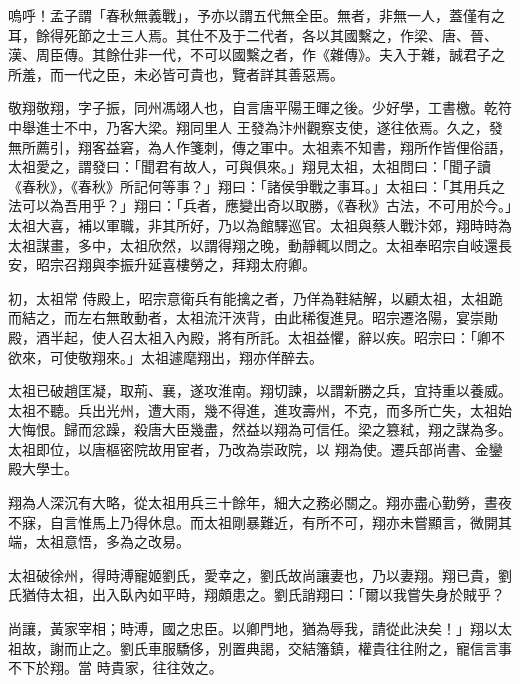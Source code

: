 
\begin{pinyinscope}

 嗚呼！孟子謂「春秋無義戰」，予亦以謂五代無全臣。無者，非無一人，蓋僅有之耳，餘得死節之士三人焉。其仕不及于二代者，各以其國繫之，作梁、唐、晉、漢、周臣傳。其餘仕非一代，不可以國繫之者，作《雜傳》。夫入于雜，誠君子之所羞，而一代之臣，未必皆可貴也，覽者詳其善惡焉。



 敬翔敬翔，字子振，同州馮翊人也，自言唐平陽王暉之後。少好學，工書檄。乾符中舉進士不中，乃客大梁。翔同里人
 王發為汴州觀察支使，遂往依焉。久之，發無所薦引，翔客益窘，為人作箋刺，傳之軍中。太祖素不知書，翔所作皆俚俗語，太祖愛之，謂發曰：「聞君有故人，可與俱來。」翔見太祖，太祖問曰：「聞子讀《春秋》，《春秋》所記何等事？」翔曰：「諸侯爭戰之事耳。」太祖曰：「其用兵之法可以為吾用乎？」翔曰：「兵者，應變出奇以取勝，《春秋》古法，不可用於今。」太祖大喜，補以軍職，非其所好，乃以為館驛巡官。太祖與蔡人戰汴郊，翔時時為太祖謀畫，多中，太祖欣然，以謂得翔之晚，動靜輒以問之。太祖奉昭宗自岐還長安，昭宗召翔與李振升延喜樓勞之，拜翔太府卿。



 初，太祖常
 侍殿上，昭宗意衛兵有能擒之者，乃佯為鞋結解，以顧太祖，太祖跪而結之，而左右無敢動者，太祖流汗浹背，由此稀復進見。昭宗遷洛陽，宴崇勛殿，酒半起，使人召太祖入內殿，將有所託。太祖益懼，辭以疾。昭宗曰：「卿不欲來，可使敬翔來。」太祖遽麾翔出，翔亦佯醉去。



 太祖已破趙匡凝，取荊、襄，遂攻淮南。翔切諫，以謂新勝之兵，宜持重以養威。太祖不聽。兵出光州，遭大雨，幾不得進，進攻壽州，不克，而多所亡失，太祖始大悔恨。歸而忿躁，殺唐大臣幾盡，然益以翔為可信任。梁之篡弒，翔之謀為多。太祖即位，以唐樞密院故用宦者，乃改為崇政院，以
 翔為使。遷兵部尚書、金鑾殿大學士。



 翔為人深沉有大略，從太祖用兵三十餘年，細大之務必關之。翔亦盡心勤勞，晝夜不寐，自言惟馬上乃得休息。而太祖剛暴難近，有所不可，翔亦未嘗顯言，微開其端，太祖意悟，多為之改易。



 太祖破徐州，得時溥寵姬劉氏，愛幸之，劉氏故尚讓妻也，乃以妻翔。翔已貴，劉氏猶侍太祖，出入臥內如平時，翔頗患之。劉氏誚翔曰：「爾以我嘗失身於賊乎？



 尚讓，黃家宰相；時溥，國之忠臣。以卿門地，猶為辱我，請從此決矣！」翔以太祖故，謝而止之。劉氏車服驕侈，別置典謁，交結籓鎮，權貴往往附之，寵信言事不下於翔。當
 時貴家，往往效之。




\end{pinyinscope}
